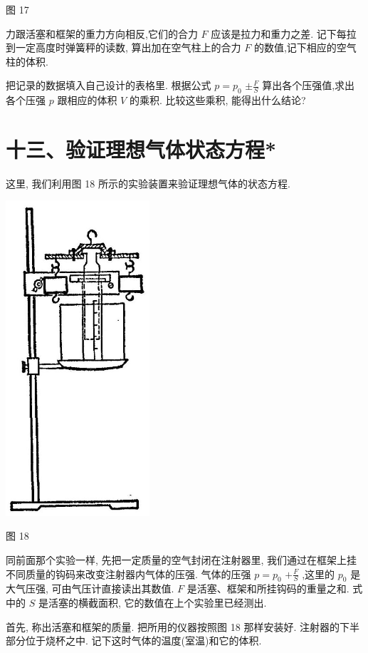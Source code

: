 \documentclass[10pt]{article}
\begin{document}
图 17

力跟活塞和框架的重力方向相反,它们的合力 \(F\) 应该是拉力和重力之差. 记下每拉到一定高度时弹簧秤的读数, 算出加在空气柱上的合力 \(F\) 的数值,记下相应的空气柱的体积.

把记录的数据填入自己设计的表格里. 根据公式 \(p = {p}_{0}\) \(\pm \frac{F}{S}\) 算出各个压强值,求出各个压强 \(p\) 跟相应的体积 \(V\) 的乘积. 比较这些乘积, 能得出什么结论?

\section*{十三、验证理想气体状态方程*}

这里, 我们利用图 18 所示的实验装置来验证理想气体的状态方程.

\begin{center}
\includegraphics[max width=0.4\textwidth]{images/01912d55-147c-70aa-b0e0-1782a122f948_341_880431.jpg}
\end{center}

图 18

同前面那个实验一样, 先把一定质量的空气封闭在注射器里, 我们通过在框架上挂不同质量的钩码来改变注射器内气体的压强. 气体的压强 \(p = {p}_{0}\) \(+ \frac{F}{S}\) ,这里的 \({p}_{0}\) 是大气压强, 可由气压计直接读出其数值. \(F\) 是活塞、框架和所挂钩码的重量之和. 式中的 \(S\) 是活塞的横截面积, 它的数值在上个实验里已经测出.

首先, 称出活塞和框架的质量. 把所用的仪器按照图 18 那样安装好. 注射器的下半部分位于烧杯之中. 记下这时气体的温度(室温)和它的体积.
\end{document}
